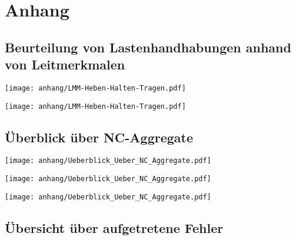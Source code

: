 \chapter{Anhang}






\section{Beurteilung von Lastenhandhabungen anhand von Leitmerkmalen}\label{cha_Anhang_5}

\clearpage

\texttt{[image: anhang/LMM-Heben-Halten-Tragen.pdf]}

\clearpage

\texttt{[image: anhang/LMM-Heben-Halten-Tragen.pdf]}


\section{Überblick über NC-Aggregate}\label{cha_Anhang_4}



\texttt{[image: anhang/Ueberblick\_Ueber\_NC\_Aggregate.pdf]}

\clearpage

\texttt{[image: anhang/Ueberblick\_Ueber\_NC\_Aggregate.pdf]}

\clearpage

\texttt{[image: anhang/Ueberblick\_Ueber\_NC\_Aggregate.pdf]}


\clearpage




\section{Übersicht über aufgetretene Fehler}\label{cha:Uebersicht_ueber_aufgetretene_Fehler}




